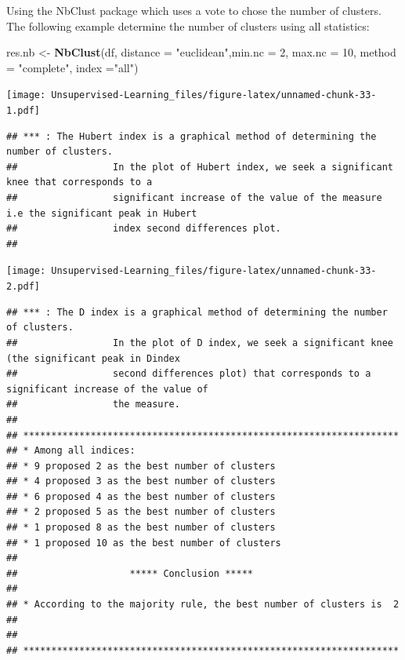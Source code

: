 \documentclass[
]{book}
\newenvironment{Shaded}{\begin{snugshade}}{\end{snugshade}}
\newcommand{\DataTypeTok}[1]{\textcolor[rgb]{0.13,0.29,0.53}{#1}}
\newcommand{\DecValTok}[1]{\textcolor[rgb]{0.00,0.00,0.81}{#1}}
\newcommand{\KeywordTok}[1]{\textcolor[rgb]{0.13,0.29,0.53}{\textbf{#1}}}
\newcommand{\NormalTok}[1]{#1}
\newcommand{\StringTok}[1]{\textcolor[rgb]{0.31,0.60,0.02}{#1}}
\begin{document}
Using the NbClust package which uses a vote to chose the number of clusters.
The following example determine the number of clusters using all statistics:

\begin{Shaded}
\begin{Highlighting}[]
\NormalTok{res.nb <-}\StringTok{ }\KeywordTok{NbClust}\NormalTok{(df, }\DataTypeTok{distance =} \StringTok{"euclidean"}\NormalTok{,}\DataTypeTok{min.nc =} \DecValTok{2}\NormalTok{, max.nc}
\NormalTok{=}\StringTok{ }\DecValTok{10}\NormalTok{, }\DataTypeTok{method =} \StringTok{"complete"}\NormalTok{, }\DataTypeTok{index =}\StringTok{"all"}\NormalTok{)}
\end{Highlighting}
\end{Shaded}

\texttt{[image: Unsupervised-Learning\_files/figure-latex/unnamed-chunk-33-1.pdf]}

\begin{verbatim}
## *** : The Hubert index is a graphical method of determining the number of clusters.
##                 In the plot of Hubert index, we seek a significant knee that corresponds to a 
##                 significant increase of the value of the measure i.e the significant peak in Hubert
##                 index second differences plot. 
## 
\end{verbatim}

\texttt{[image: Unsupervised-Learning\_files/figure-latex/unnamed-chunk-33-2.pdf]}

\begin{verbatim}
## *** : The D index is a graphical method of determining the number of clusters. 
##                 In the plot of D index, we seek a significant knee (the significant peak in Dindex
##                 second differences plot) that corresponds to a significant increase of the value of
##                 the measure. 
##  
## ******************************************************************* 
## * Among all indices:                                                
## * 9 proposed 2 as the best number of clusters 
## * 4 proposed 3 as the best number of clusters 
## * 6 proposed 4 as the best number of clusters 
## * 2 proposed 5 as the best number of clusters 
## * 1 proposed 8 as the best number of clusters 
## * 1 proposed 10 as the best number of clusters 
## 
##                    ***** Conclusion *****                            
##  
## * According to the majority rule, the best number of clusters is  2 
##  
##  
## *******************************************************************
\end{verbatim}
\end{document}

